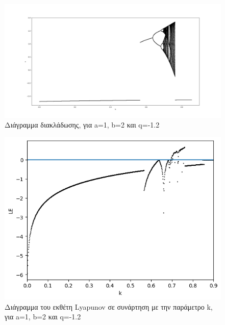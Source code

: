 \begin{figure}[h!]
	\centering
	\includegraphics[width=0.6\linewidth]{LateX images/graphs q12/g1}
	\caption{ Διάγραμμα διακλάδωσης, για a=1, b=2 και q=-1.2}
	\label{f:g16}
\end{figure}

\begin{figure}[h!]
	\centering
	\includegraphics[width=0.6\linewidth]{LateX images/graphs q12/g2}
	\caption{Διάγραμμα του εκθέτη Lyapunov σε συνάρτηση με την παράμετρο k, για a=1, b=2 και q=-1.2}
	\label{f:g17}
\end{figure}

